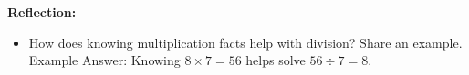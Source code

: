 \documentclass[12pt]{article}
\begin{document}
\vspace{2em}

\begin{tcolorbox}[colframe=black!60, colback=white, 
coltitle=black, colbacktitle=black!15, fonttitle=\bfseries\Large, 
title=Exit Ticket, halign title=center, left=10pt, right=10pt, top=10pt, bottom=15pt]
\textbf{Reflection:}
\begin{itemize}
    \item How does knowing multiplication facts help with division? Share an example.
    {\color{red}Example Answer: Knowing \(8 \times 7 = 56\) helps solve \(56 \div 7 = 8\).}
\end{itemize}
\end{tcolorbox}
\end{document}
